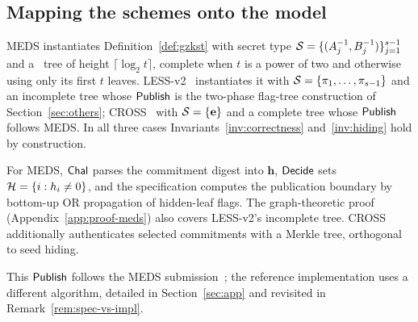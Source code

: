 \subsection{Mapping the schemes onto the model}
\label{sec:mapping}

\begin{proposition}
\label{prop:meds-gzkst}
MEDS instantiates Definition~\ref{def:gzkst} with secret type
$\mathcal{S} = \{(A_j^{-1},B_j^{-1})\}_{j=1}^{s-1}$ and a \GGM\ tree of height
$\lceil\log_2 t\rceil$, complete when $t$ is a power of two and otherwise
using only its first $t$ leaves. LESS-v2~\cite{LESS-spec} instantiates it with
$\mathcal{S} = \{\pi_1,\ldots,\pi_{s-1}\}$ and an incomplete tree whose $\mathsf{Publish}$
is the two-phase flag-tree construction of Section~\ref{sec:others};
CROSS~\cite{CROSSspec} with $\mathcal{S} = \{\mathbf{e}\}$ and a complete tree whose
$\mathsf{Publish}$ follows MEDS. In all three cases
Invariants~\ref{inv:correctness} and~\ref{inv:hiding} hold by construction.
\end{proposition}

\label{prop:less-gzkst}%
For MEDS, $\mathsf{Chal}$ parses the commitment digest into $\mathbf h$,
$\mathsf{Decide}$ sets $\mathcal{H}=\{i:h_i\ne0\}$, and the specification computes the
publication boundary by bottom-up OR propagation of hidden-leaf flags.
The graph-theoretic proof (Appendix~\ref{app:proof-meds}) also covers
LESS-v2's incomplete tree. CROSS additionally authenticates selected
commitments with a Merkle tree, orthogonal to seed hiding.

\begin{remark}
This $\mathsf{Publish}$ follows the MEDS submission~\cite{MEDS_PQC}; the reference
implementation uses a different algorithm, detailed in Section~\ref{sec:app}
and revisited in Remark~\ref{rem:spec-vs-impl}.
\end{remark}

